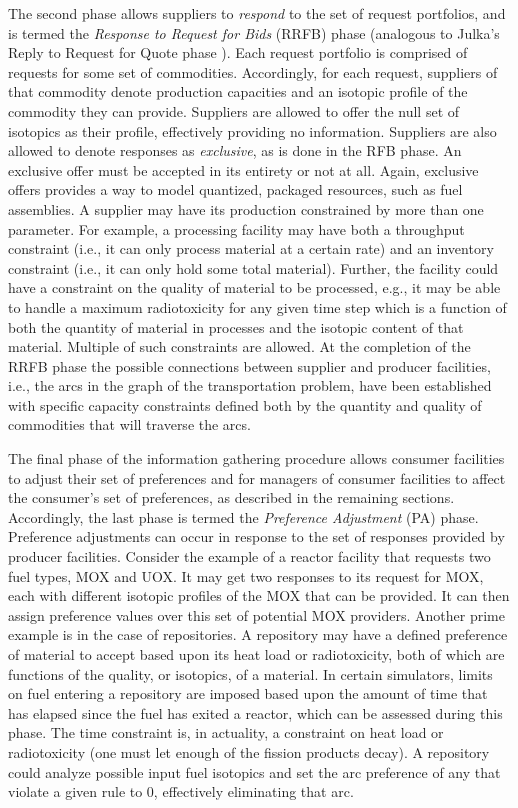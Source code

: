 The second phase allows suppliers to \textit{respond} to the set of request
portfolios, and is termed the \textit{Response to Request for Bids} (RRFB) phase
(analogous to Julka's Reply to Request for Quote phase
\cite{julka_agent-based_2002}). Each request portfolio is comprised of requests
for some set of commodities. Accordingly, for each request, suppliers of that
commodity denote production capacities and an isotopic profile of the commodity
they can provide. Suppliers are allowed to offer the null set of isotopics as
their profile, effectively providing no information. Suppliers are also allowed
to denote responses as \textit{exclusive}, as is done in the RFB phase. An
exclusive offer must be accepted in its entirety or not at all. Again, exclusive
offers provides a way to model quantized, packaged resources, such as fuel
assemblies. A supplier may have its production constrained by more than one
parameter. For example, a processing facility may have both a throughput
constraint (i.e., it can only process material at a certain rate) and an
inventory constraint (i.e., it can only hold some total material). Further, the
facility could have a constraint on the quality of material to be processed,
e.g., it may be able to handle a maximum radiotoxicity for any given time step
which is a function of both the quantity of material in processes and the
isotopic content of that material. Multiple of such constraints are allowed. At
the completion of the RRFB phase the possible connections between supplier and
producer facilities, i.e., the arcs in the graph of the transportation problem,
have been established with specific capacity constraints defined both by the
quantity and quality of commodities that will traverse the arcs.

The final phase of the information gathering procedure allows consumer
facilities to adjust their set of preferences and for managers of consumer
facilities to affect the consumer's set of preferences, as described in the
remaining sections. Accordingly, the last phase is termed the \textit{Preference
 Adjustment} (PA) phase. Preference adjustments can occur in response to the
set of responses provided by producer facilities. Consider the example of a
reactor facility that requests two fuel types, MOX and UOX. It may get two
responses to its request for MOX, each with different isotopic profiles of the
MOX that can be provided. It can then assign preference values over this set of
potential MOX providers. Another prime example is in the case of repositories. A
repository may have a defined preference of material to accept based upon its
heat load or radiotoxicity, both of which are functions of the quality, or
isotopics, of a material. In certain simulators, limits on fuel entering a
repository are imposed based upon the amount of time that has elapsed since the
fuel has exited a reactor, which can be assessed during this phase. The time
constraint is, in actuality, a constraint on heat load or radiotoxicity (one
must let enough of the fission products decay). A repository could analyze
possible input fuel isotopics and set the arc preference of any that violate a
given rule to 0, effectively eliminating that arc.

